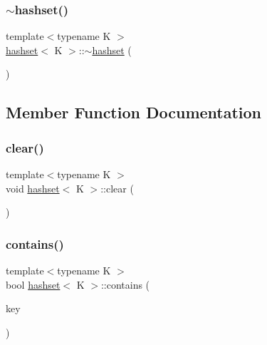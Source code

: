 \mbox{\label{classhashset_a6dfea39f30e30519e3808ce3989dad10}} 
\subsubsection{\texorpdfstring{$\sim$hashset()}{~hashset()}}
{\footnotesize\ttfamily template$<$typename K $>$ \\
\hyperlink{classhashset}{hashset}$<$ K $>$\+::$\sim$\hyperlink{classhashset}{hashset} (\begin{DoxyParamCaption}{ }\end{DoxyParamCaption})\hspace{0.3cm}{\ttfamily [inline]}}



\subsection{Member Function Documentation}
\mbox{\label{classhashset_a137e69aebc7f357881fac8adfef0e102}} 
\subsubsection{\texorpdfstring{clear()}{clear()}}
{\footnotesize\ttfamily template$<$typename K $>$ \\
void \hyperlink{classhashset}{hashset}$<$ K $>$\+::clear (\begin{DoxyParamCaption}{ }\end{DoxyParamCaption})\hspace{0.3cm}{\ttfamily [inline]}}

\mbox{\label{classhashset_af90785af306bbe96d2e07f8ad0842a06}} 
\subsubsection{\texorpdfstring{contains()}{contains()}}
{\footnotesize\ttfamily template$<$typename K $>$ \\
bool \hyperlink{classhashset}{hashset}$<$ K $>$\+::contains (\begin{DoxyParamCaption}\item[{K $\ast$const}]{key }\end{DoxyParamCaption})\hspace{0.3cm}{\ttfamily [inline]}}

